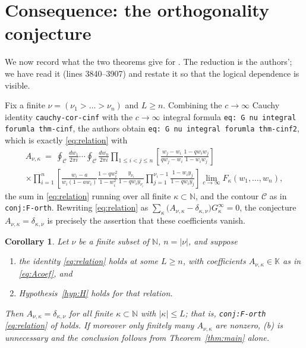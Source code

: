 \documentclass[11pt]{article}
\newtheorem{cor}[thm]{Corollary}
\theoremstyle{definition}
\theoremstyle{remark}
\newcommand{\NN}{\mathbb{N}}
\newcommand{\KK}{\mathbb{K}}
\newcommand{\Gi}[1]{G^{\infty}_{#1}}
\begin{document}
\section{Consequence: the orthogonality conjecture}\label{sec:consequence}

We now record what the two theorems give for \cite[Conjecture \texttt{conj:F-orth}]{GDMW}. The
reduction is the authors'; we have read it (lines 3840--3907) and restate it so that the
logical dependence is visible.

Fix a finite $\nu=(\nu_1>\dots>\nu_n)$ and $L\ge n$. Combining the $c\to\infty$ Cauchy identity
\texttt{cauchy-cor-cinf} with the $c\to\infty$ integral formula
\texttt{eq: G nu integral forumla thm-cinf}, the authors obtain
\texttt{eq: G nu integral forumla thm-cinf2}, which is exactly \eqref{eq:relation} with
\begin{multline}\label{eq:Acoef}
  A_{\nu,\kappa}\ =\ \oint_{\mathcal{C}}\frac{dw_1}{2\pi i}\cdots\oint_{\mathcal{C}}\frac{dw_n}{2\pi i}
  \prod_{1\le i<j\le n}\left[\frac{w_j-w_i}{qw_j-w_i}\frac{1-qw_iw_j}{1-w_iw_j}\right]\\
  \times\prod_{i=1}^{n}\left[\frac{w_i-a}{w_i(1-aw_i)}\frac{1-qw_i^2}{1-w_i^2}
     \frac{y_{\nu_i}}{1-qw_iy_{\nu_i}}\prod_{j=1}^{\nu_i-1}\frac{1-w_iy_j}{1-qw_iy_j}\right]
  \lim_{c\to\infty}F_\kappa(w_1,\dots,w_n),
\end{multline}
the sum in \eqref{eq:relation} running over all finite $\kappa\subset\NN$, and the contour
$\mathcal{C}$ as in \texttt{conj:F-orth}. Rewriting \eqref{eq:relation} as
$\sum_{\kappa}\bigl(A_{\nu,\kappa}-\delta_{\kappa,\nu}\bigr)\Gi\kappa=0$, the conjecture
$A_{\nu,\kappa}=\delta_{\kappa,\nu}$ is precisely the assertion that these coefficients vanish.

\begin{cor}\label{cor:main}
Let $\nu$ be a finite subset of $\NN$, $n=|\nu|$, and suppose
\begin{enumerate}
\item[(a)] the identity \eqref{eq:relation} holds at some $L\ge n$, with coefficients
  $A_{\nu,\kappa}\in\KK$ as in \eqref{eq:Acoef}, and
\item[(b)] Hypothesis~\ref{hyp:H} holds for that relation.
\end{enumerate}
Then $A_{\nu,\kappa}=\delta_{\kappa,\nu}$ for all finite $\kappa\subset\NN$ with
$|\kappa|\le L$; that is, \texttt{conj:F-orth} \eqref{eq:relation} of \cite{GDMW} holds. If
moreover only finitely many $A_{\nu,\kappa}$ are nonzero, (b) is unnecessary and the conclusion
follows from Theorem~\ref{thm:main} alone.
\end{cor}
\end{document}
